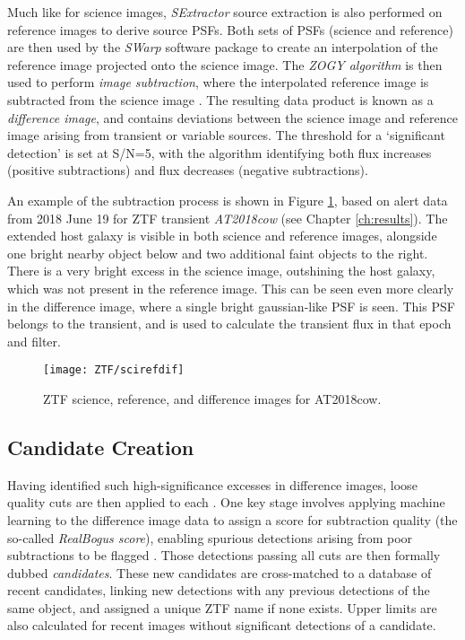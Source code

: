 Much like for science images, \emph{SExtractor} source extraction is also performed on reference images to derive source PSFs. Both sets of PSFs (science and reference) are then used by the \emph{SWarp} software package  to create an interpolation of the reference image projected onto the science image. The \emph{ZOGY algorithm} is then used to perform \emph{image subtraction}, where the interpolated reference image is subtracted from the science image . The resulting data product is known as a \emph{difference image}, and contains deviations between the science image and reference image arising from transient or variable sources. The threshold for a `significant detection' is set at S/N=5, with the algorithm identifying both flux increases (positive subtractions) and flux decreases (negative subtractions). 

An example of the subtraction process is shown in Figure \ref{fig:ztf_scirefdif}, based on alert data from 2018 June 19 for ZTF transient \emph{AT2018cow} (see Chapter \ref{ch:results}). The extended host galaxy is visible in both science and reference images, alongside one bright nearby object below and two additional faint objects to the right. There is a very bright excess in the science image, outshining the host galaxy, which was not present in the reference image. This can be seen even more clearly in the difference image, where a single bright gaussian-like PSF is seen. This PSF belongs to the transient, and is used to calculate the transient flux in that epoch and filter.

\begin{figure}
	\centering \texttt{[image: ZTF/scirefdif]}
	\caption{ZTF science, reference, and difference images for AT2018cow.}
	\label{fig:ztf_scirefdif}
\end{figure} 

\subsection*{Candidate Creation}

Having identified such high-significance excesses in difference images, loose quality cuts are then applied to each \cite{ztf_data_processing}. One key stage involves applying machine learning to the difference image data to assign a score for subtraction quality (the so-called \emph{RealBogus score}), enabling spurious detections arising from poor subtractions to be flagged \cite{ztf_ml_19}. Those detections passing all cuts are then formally dubbed \emph{candidates}. These new candidates are cross-matched to a database of recent candidates, linking new detections with any previous detections of the same object, and assigned a unique ZTF name if none exists. Upper limits are also calculated for recent images without significant detections of a candidate. 

